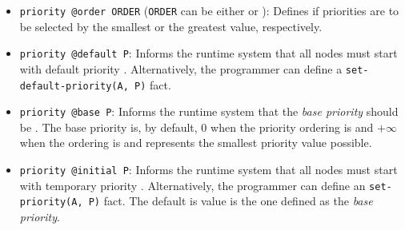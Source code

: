 
\begin{itemize}

   \item \texttt{priority @order ORDER} (\texttt{ORDER} can be either 
      or ): Defines if priorities are to be selected by the smallest
      or the greatest value, respectively.

   \item \texttt{priority @default P}: Informs the runtime system that all nodes
      must start with default priority . Alternatively, the programmer can define a
      \texttt{set-default-priority(A, P)} fact.

   \item \texttt{priority @base P}: Informs the runtime system that the
      \emph{base priority} should be . The base priority is, by default,
      0 when the priority ordering is  and $+\infty$ when the ordering
      is  and represents the smallest priority value possible.

   \item \texttt{priority @initial P}: Informs the runtime system that all nodes
   must start with temporary priority . Alternatively, the programmer can define an
      \texttt{set-priority(A, P)} fact. The default is value is the one defined
      as the \emph{base priority}.

\end{itemize}

